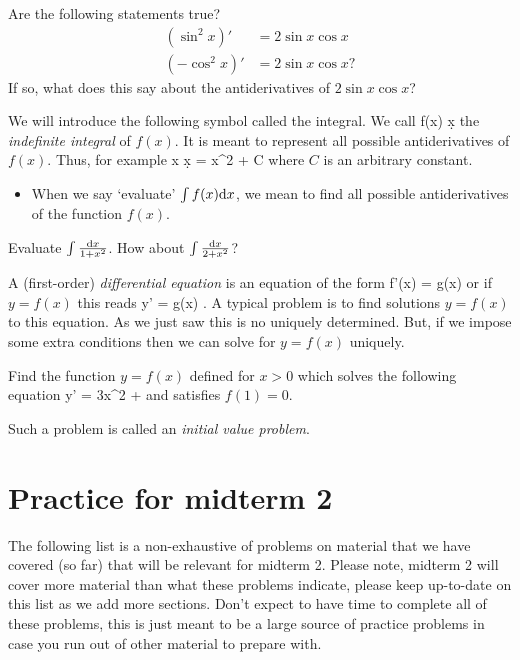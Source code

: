 \documentclass[11pt]{amsart}
\begin{document}
\begin{eg} 
Are the following statements true? 
\begin{align*}
\left(\sin^2 x\right)' & = 2 \sin x \cos x \\
\left(-\cos^2 x\right)' & = 2 \sin x \cos x ?
\end{align*} 
If so, what does this say about the antiderivatives of $2 \sin x \cos x$? 
\end{eg}

\newpage

We will introduce the following symbol called the integral. 
We call 
\beqn
\int f(x) \d x
\eeqn
the {\em indefinite integral} of $f(x)$. 
It is meant to represent all possible antiderivatives of $f(x)$.
Thus, for example
\beqn
\int x \d x =  x^2 + C
\eeqn
where $C$ is an arbitrary constant.

\begin{itemize}
\item When we say `evaluate' $\int f(x) {\rm d} x$, we mean to find all possible antiderivatives of the function $f(x)$. 
\end{itemize}

\begin{eg}
Evaluate $\int \frac{{\rm d} x}{1 + x^2}$. 
How about $\int \frac{{\rm d} x}{2 + x^2}$? 
\end{eg}

\newpage

A (first-order) \textit{differential equation} is an equation of the form 
\beqn
f'(x) = g(x)
\eeqn
or if $y = f(x)$ this reads
\beqn
y' = g(x) .
\eeqn
A typical problem is to find solutions $y=f(x)$ to this equation. 
As we just saw this is no uniquely determined. 
But, if we impose some extra conditions then we can solve for $y=f(x)$ uniquely. 

\begin{eg}
Find the function $y = f(x)$ defined for $x > 0$ which solves the following equation 
\beqn
y' = 3x^2 +  
\eeqn
and satisfies $f(1) = 0$. 
\end{eg}
Such a problem is called an \textit{initial value problem}. 

\newpage

\section*{Practice for midterm 2}

The following list is a non-exhaustive of problems on material that we have covered (so far) that will be relevant for midterm 2.
Please note, midterm 2 will cover more material than what these problems indicate, please keep up-to-date on this list as we add more sections.
Don't expect to have time to complete all of these problems, this is just meant to be a large source of practice problems in case you run out of other material to prepare with. 
\end{document}
